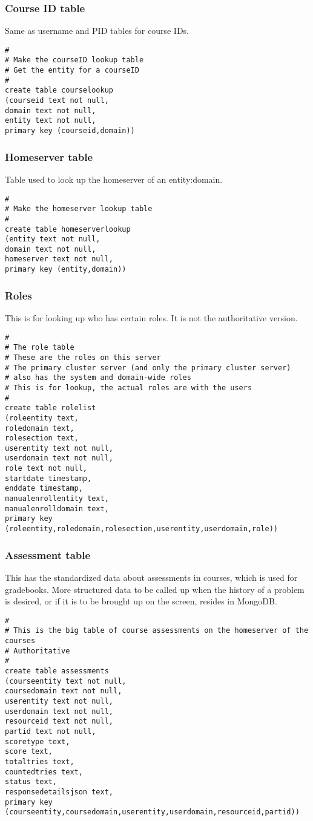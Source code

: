 \subsubsection{Course ID table}
Same as username and PID tables for course IDs.
\begin{verbatim}
#
# Make the courseID lookup table
# Get the entity for a courseID
#
create table courselookup
(courseid text not null,
domain text not null,
entity text not null,
primary key (courseid,domain))
\end{verbatim}
\subsubsection{Homeserver table}
Table used to look up the homeserver of an entity:domain.
\begin{verbatim}
#
# Make the homeserver lookup table
#
create table homeserverlookup
(entity text not null,
domain text not null,
homeserver text not null,
primary key (entity,domain))
\end{verbatim}
\subsubsection{Roles}
This is for looking up who has certain roles. It is not the authoritative version.
\begin{verbatim}
#
# The role table
# These are the roles on this server
# The primary cluster server (and only the primary cluster server)
# also has the system and domain-wide roles
# This is for lookup, the actual roles are with the users
#
create table rolelist
(roleentity text,
roledomain text,
rolesection text,
userentity text not null,
userdomain text not null,
role text not null,
startdate timestamp,
enddate timestamp,
manualenrollentity text,
manualenrolldomain text,
primary key (roleentity,roledomain,rolesection,userentity,userdomain,role))
\end{verbatim}
\subsubsection{Assessment table}
This has the standardized data about assessments in courses, which is used for gradebooks. More structured data to be called up when the history of a problem is desired, or if it is to be brought up on the screen, resides in MongoDB.
\begin{verbatim}
#
# This is the big table of course assessments on the homeserver of the courses
# Authoritative
#
create table assessments
(courseentity text not null,
coursedomain text not null,
userentity text not null,
userdomain text not null,
resourceid text not null,
partid text not null,
scoretype text,
score text,
totaltries text,
countedtries text,
status text,
responsedetailsjson text,
primary key (courseentity,coursedomain,userentity,userdomain,resourceid,partid))
\end{verbatim}
